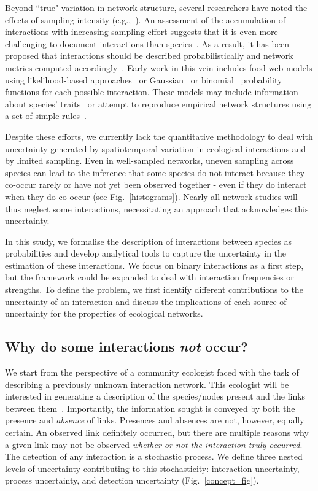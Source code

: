 \documentclass[12pt]{article}
\begin{document}
\begin{spacing}{2.0}
    Beyond ``true" variation in network structure, several researchers have noted the effects of sampling intensity (e.g.,~\citealp{Martinez1999,Bluthgen2006,Bluthgen2007}). An assessment of the accumulation of interactions with increasing sampling effort suggests that it is even more challenging to document interactions than species~\citep{Poisot2012}. As a result, it has been proposed that interactions should be described probabilistically and network metrics computed accordingly~\citep{Poisot2016}. Early work in this vein includes food-web models using likelihood-based approaches~\citep{Allesina2008} or Gaussian~\citep{Williams2010} or binomial~\citep{Rohr2016} probability functions for each possible interaction. These models may include information about species' traits~\citep{Rohr2016} or attempt to reproduce empirical network structures using a set of simple rules~\citep{Allesina2008,Williams2010}.


    Despite these efforts, we currently lack the quantitative methodology to deal with uncertainty generated by spatiotemporal variation in ecological interactions and by limited sampling. Even in well-sampled networks, uneven sampling across species can lead to the inference that some species do not interact because they co-occur rarely or have not yet been observed together - even if they do interact when they do co-occur (see Fig.~\ref{histograms}). Nearly all network studies will thus neglect some interactions, necessitating an approach that acknowledges this uncertainty.


    In this study, we formalise the description of interactions between species as probabilities and develop analytical tools to capture the uncertainty in the estimation of these interactions. We focus on binary interactions as a first step, but the framework could be expanded to deal with interaction frequencies or strengths. To define the problem, we first identify different contributions to the uncertainty of an interaction and discuss the implications of each source of uncertainty for the properties of ecological networks. 


    \subsection*{Why do some interactions \emph{not} occur?}

      We start from the perspective of a community ecologist faced with the task of describing a previously unknown interaction network. This ecologist will be interested in generating a description of the species/nodes present and the links between them~\citep{Roslin2016}.  Importantly, the information sought is conveyed by both the presence and \emph{absence} of links. Presences and absences are not, however, equally certain. An observed link definitely occurred, but there are multiple reasons why a given link may not be observed \emph{whether or not the interaction truly occurred}. The detection of any interaction is a stochastic process. We define three nested levels of uncertainty contributing to this stochasticity: interaction uncertainty, process uncertainty, and detection uncertainty (Fig.~\ref{concept_fig}).



\end{spacing}
\end{document}
